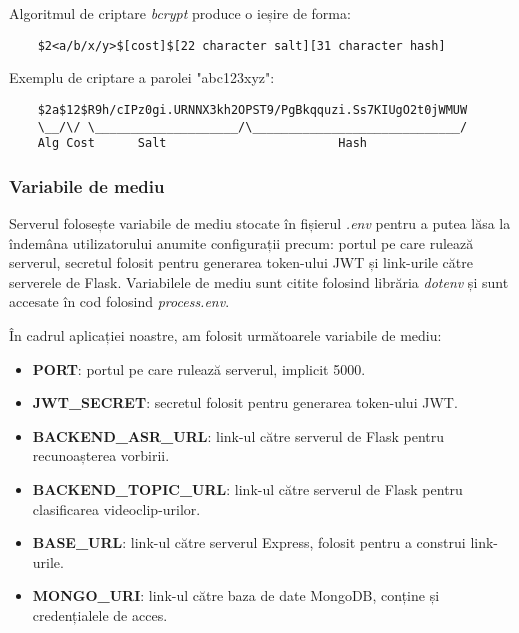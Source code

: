 \par
Algoritmul de criptare \textit{bcrypt} produce o ieșire de forma:
\begin{verbatim}
    $2<a/b/x/y>$[cost]$[22 character salt][31 character hash]
\end{verbatim}

Exemplu de criptare a parolei "abc123xyz"\footnotemark[1]:
\begin{verbatim}
    $2a$12$R9h/cIPz0gi.URNNX3kh2OPST9/PgBkqquzi.Ss7KIUgO2t0jWMUW
    \__/\/ \____________________/\_____________________________/
    Alg Cost      Salt                        Hash
\end{verbatim}


\subsubsection{Variabile de mediu}
Serverul folosește variabile de mediu stocate în fișierul \textit{.env} pentru a putea lăsa
la îndemâna utilizatorului anumite configurații precum: portul pe care rulează serverul, secretul
folosit pentru generarea token-ului JWT și link-urile către serverele de Flask. Variabilele de mediu
sunt citite folosind librăria \textit{dotenv} și sunt accesate în cod folosind \textit{process.env}.
\par
În cadrul aplicației noastre, am folosit următoarele variabile de mediu:
\begin{itemize}
    \item \textbf{PORT}: portul pe care rulează serverul, implicit 5000.
    \item \textbf{JWT\_SECRET}: secretul folosit pentru generarea token-ului JWT.
    \item \textbf{BACKEND\_ASR\_URL}: link-ul către serverul de Flask pentru recunoașterea vorbirii.
    \item \textbf{BACKEND\_TOPIC\_URL}: link-ul către serverul de Flask pentru clasificarea videoclip-urilor.
    \item \textbf{BASE\_URL}: link-ul către serverul Express, folosit pentru a construi link-urile.
    \item \textbf{MONGO\_URI}: link-ul către baza de date MongoDB, conține și credențialele de acces.
\end{itemize}


